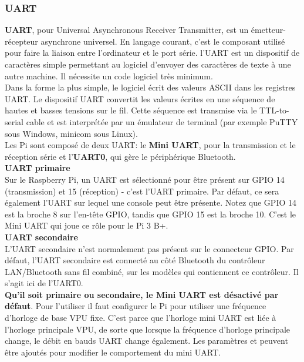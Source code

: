 \documentclass[12pt,a4paper,oneside]{book}
\begin{document}
	\subsubsection{UART}
	\textbf{UART}, pour Universal Asynchronous Receiver Transmitter, est un émetteur-récepteur asynchrone universel. En langage courant, c'est le composant utilisé pour faire la liaison entre l'ordinateur et le port série. l'UART est un dispositif de caractères simple permettant au logiciel d'envoyer des caractères de texte à une autre machine. Il nécessite un code logiciel très minimum.\\
	Dans la forme la plus simple, le logiciel écrit des valeurs ASCII dans les registres UART. Le dispositif UART convertit les valeurs écrites en une séquence de hautes et basses tensions sur le fil. Cette séquence est transmise via le TTL-to-serial cable et est interprétée par un émulateur de terminal (par exemple PuTTY sous Windows, minicom sous Linux).\\
	
	Les Pi sont composé de deux UART: le \textbf{Mini UART}, pour la transmission et le réception série et l'\textbf{UART0}, qui gère le périphérique Bluetooth. \\
	
	\textbf{UART primaire}\\
	Sur le Raspberry Pi, un UART est sélectionné pour être présent sur GPIO 14 (transmission) et 15 (réception) - c’est l’UART primaire. Par défaut, ce sera également l’UART sur lequel une console peut être présente. Notez que GPIO 14 est la broche 8 sur l’en-tête GPIO, tandis que GPIO 15 est la broche 10. C'est le Mini UART qui joue ce rôle pour le Pi 3 B+.\\
	
	\textbf{UART secondaire}\\
	L’UART secondaire n’est normalement pas présent sur le connecteur GPIO. Par défaut, l’UART secondaire est connecté au côté Bluetooth du contrôleur LAN/Bluetooth sans fil combiné, sur les modèles qui contiennent ce contrôleur. Il s'agit ici de l'UART0.\\
	
	\textbf{Qu'il soit primaire ou secondaire, le Mini UART est désactivé par défaut}. Pour l'utiliser il faut configurer le Pi pour utiliser une fréquence d’horloge de base VPU fixe. C’est parce que l’horloge mini UART est liée à l’horloge principale VPU, de sorte que lorsque la fréquence d’horloge principale change, le débit en bauds UART change également. Les paramètres et peuvent être ajoutés pour modifier le comportement du mini UART.\\
	
\end{document}
